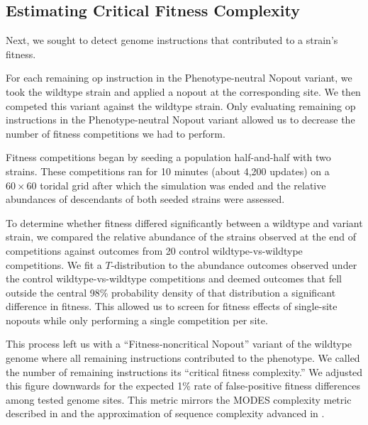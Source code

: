 \subsection{Estimating Critical Fitness Complexity}

Next, we sought to detect genome instructions that contributed to a strain's fitness.

For each remaining op instruction in the Phenotype-neutral Nopout variant, we took the wildtype strain and applied a nopout at the corresponding site.
We then competed this variant against the wildtype strain.
Only evaluating remaining op instructions in the Phenotype-neutral Nopout variant allowed us to decrease the number of fitness competitions we had to perform.

Fitness competitions began by seeding a population half-and-half with two strains.
These competitions ran for 10 minutes (about 4,200 updates) on a $60\times60$ toridal grid after which the simulation was ended and the relative abundances of descendants of both seeded strains were assessed.

To determine whether fitness differed significantly between a wildtype and variant strain, we compared the relative abundance of the strains observed at the end of competitions against outcomes from 20 control wildtype-vs-wildtype competitions.
We fit a $T$-distribution to the abundance outcomes observed under the control wildtype-vs-wildtype competitions and deemed outcomes that fell outside the central 98\% probability density of that distribution a significant difference in fitness.
This allowed us to screen for fitness effects of single-site nopouts while only performing a single competition per site.

This process left us with a ``Fitness-noncritical Nopout'' variant of the wildtype genome where all remaining instructions contributed to the phenotype.
We called the number of remaining instructions its ``critical fitness complexity.''
We adjusted this figure downwards for the expected 1\% rate of false-positive fitness differences among tested genome sites.
This metric mirrors the MODES complexity metric described in \citep{dolson2019modes} and the approximation of sequence complexity advanced in \citep{adami2000evolution}.



